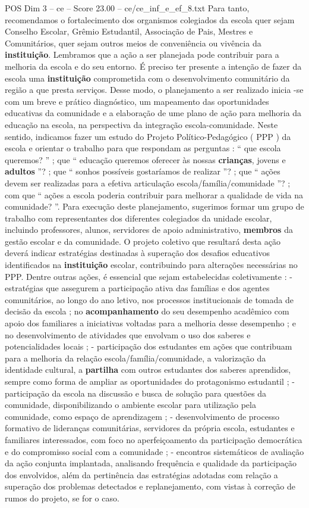 \begin{textsample}{POS Dim 3 – ce – Score 23.00 – ce/ce\_inf\_e\_ef\_8.txt}
Para tanto, recomendamos o fortalecimento dos organismos colegiados da escola quer sejam Conselho Escolar, Grêmio Estudantil, Associação de Pais, Mestres e Comunitários, quer sejam outros meios de conveniência ou vivência da \textbf{instituição}.
Lembramos que a ação a ser planejada pode contribuir para a melhoria da escola e do seu entorno.
É preciso ter presente a intenção de fazer da escola uma \textbf{instituição} comprometida com o desenvolvimento comunitário da região a que presta serviços.
Desse modo, o planejamento a ser realizado inicia -se com um breve e prático diagnóstico, um mapeamento das oportunidades educativas da comunidade e a elaboração de ume plano de ação para melhoria da educação na escola, na perspectiva da integração escola-comunidade.
Neste sentido, indicamos fazer um estudo do Projeto Político-Pedagógico ( PPP ) da escola e orientar o trabalho para que respondam as perguntas : “ que escola queremos? ” ; que “ educação queremos oferecer às nossas \textbf{crianças}, jovens e \textbf{adultos} ”? ; que “ sonhos possíveis gostaríamos de realizar ”? ; que “ ações devem ser realizadas para a efetiva articulação escola/família/comunidade ”? ; com que “ ações a escola poderia contribuir para melhorar a qualidade de vida na comunidade? ”.
Para execução deste planejamento, sugerimos formar um grupo de trabalho com representantes dos diferentes colegiados da unidade escolar, incluindo professores, alunos, servidores de apoio administrativo, \textbf{membros} da gestão escolar e da comunidade.
O projeto coletivo que resultará desta ação deverá indicar estratégias destinadas à superação dos desafios educativos identificados na \textbf{instituição} escolar, contribuindo para alterações necessárias no PPP.
Dentre outras ações, é essencial que sejam estabelecidas coletivamente : - estratégias que assegurem a participação ativa das famílias e dos agentes comunitários, ao longo do ano letivo, nos processos institucionais de tomada de decisão da escola ; no \textbf{acompanhamento} do seu desempenho acadêmico com apoio dos familiares a iniciativas voltadas para a melhoria desse desempenho ; e no desenvolvimento de atividades que envolvam o uso dos saberes e potencialidades locais ; - participação dos estudantes em ações que contribuam para a melhoria da relação escola/família/comunidade, a valorização da identidade cultural, a \textbf{partilha} com outros estudantes dos saberes aprendidos, sempre como forma de ampliar as oportunidades do protagonismo estudantil ; - participação da escola na discussão e busca de solução para questões da comunidade, disponibilizando o ambiente escolar para utilização pela comunidade, como espaço de aprendizagem ; - desenvolvimento de processo formativo de lideranças comunitárias, servidores da própria escola, estudantes e familiares interessados, com foco no aperfeiçoamento da participação democrática e do compromisso social com a comunidade ; - encontros sistemáticos de avaliação da ação conjunta implantada, analisando frequência e qualidade da participação dos envolvidos, além da pertinência das estratégias adotadas com relação a superação dos problemas detectados e replanejamento, com vistas à correção de rumos do projeto, se for o caso.

\end{textsample}
